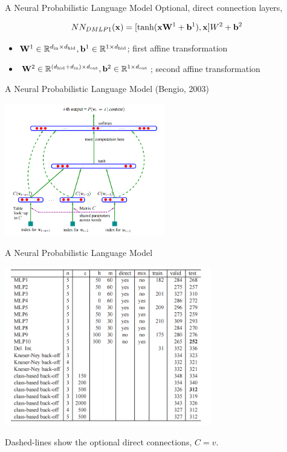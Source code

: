 \documentclass{beamer}
\begin{document}
\begin{frame}{A Neural Probabilistic Language Model }  
  Optional, direct connection layers,

  \[NN_{DMLP1}(\mathbf{x}) =  [\tanh(\mathbf{x}\mathbf{W}^1 + \mathbf{b}^1), \mathbf{x}] W^2 + \mathbf{b}^2\]

  \begin{itemize}
  \item $\mathbf{W}^1 \in \mathbb{R}^{{d_{\mathrm{in}}} \times {d_{\mathrm{hid}}}}, \mathbf{b}^1 \in \mathbb{R}^{1 \times {d_{\mathrm{hid}}}}$; first affine transformation
  \item $\mathbf{W}^2 \in \mathbb{R}^{({d_{\mathrm{hid}}} + {d_{\mathrm{in}}})  \times {d_{\mathrm{out}}}}, \mathbf{b}^2 \in \mathbb{R}^{1 \times {d_{\mathrm{out}}}}$; second affine transformation
  \end{itemize}
\end{frame}

\begin{frame}{A Neural Probabilistic Language Model (Bengio, 2003)}  
  \begin{center}
    \includegraphics[width=7cm]{bengio}
  \end{center}
\end{frame}



\begin{frame}{A Neural Probabilistic Language Model }  
  \begin{center}
    \includegraphics[width=9cm]{bengioresults}
  \end{center}

  Dashed-lines show the optional direct connections, $C = v$.
\end{frame}
\end{document}

